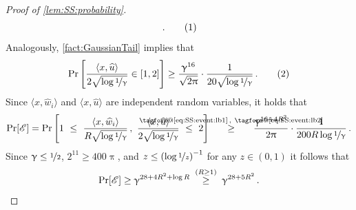 \documentclass[11pt,letterpaper]{article}
\makeatletter
\theoremstyle{plain}
\theoremstyle{definition}
\theoremstyle{remark}
\newcommand{\yesnum}{\addtocounter{equation}{1}\tag{\theequation}}
\renewcommand{\eqref}[1]{\textup{\eqrefform@{\ref{#1}}}}
\let\eqrefform@\tagform@
\newcommand{\Stackrel}[2]{\stackrel{\mathmakebox[\widthof{\ensuremath{#2}}]{#1}}{#2}}
\newcommand{\sinangle}[1]{\ensuremath{\langle#1\rangle}}
\newcommand{\inparen}[1]{\ensuremath{\left(#1\right)}}
\newcommand{\insquare}[1]{\ensuremath{\left[#1\right]}}
\newcommand{\inangle}[1]{\left\langle#1\right\rangle}
\newcommand{\evE}{\ensuremath{\mathscr{E}}}
\newcommand{\nfrac}[2]{\nicefrac{#1}{#2}}
\newcommand{\wh}[1]{\widehat{#1}}
\renewcommand{\gamma}{\upgamma}
\renewcommand{\pi}{\uppi}
\makeatother
\begin{document}
{{{\begin{proof}[Proof of \cref{lem:SS:probability}]
\[                        \,.
                        \yesnum\label{eq:SS:event:lb1}
                    \]
                    Analogously, \cref{fact:GaussianTail} implies that 
                    \[
                        \Pr\insquare{
                            \frac{\sinangle{x, \wh{u}}}{
                                2\sqrt{\log{\nfrac{1}{\gamma}}}
                            } \in [1,2]
                        }
                        \geq \frac{\gamma^{16}}{\sqrt{2\pi}} \cdot \frac{1}{20\sqrt{\log{\nfrac{1}{\gamma}}}}
                        \,.
                        \yesnum\label{eq:SS:event:lb2}
                    \]
                    Since $\sinangle{x, \wh{w}_i}$ and $\sinangle{x, \wh{u}}$ are independent random variables, it holds that 
                    \[
                        \Pr[\evE]
                        = 
                        \Pr\insquare{
                            1 ~\leq~ 
                            \frac{\inangle{x, \wh{w}_i}}{
                                R\sqrt{\log{\nfrac{1}{\gamma}}}
                            }\,,
                            ~
                            \frac{\inangle{x, \wh{u}}}{
                                2\sqrt{\log{\nfrac{1}{\gamma}}}
                            }
                            ~\leq~ 2
                        }
                        ~~\quad\Stackrel{
                            \eqref{eq:SS:event:lb1}\,,~
                            \eqref{eq:SS:event:lb2}
                        }{\geq}\quad~~
                        \frac{\gamma^{16+4R^2}}{2\pi}\cdot \frac{1}{200R\log{\nfrac{1}{\gamma}}}\,.
                    \]
                    Since $\gamma \leq \nfrac{1}{2}$, $2^{11}\geq {400\pi}$, and $z\leq \inparen{{\log{\nfrac{1}{z}}}}^{-1}$ for any $z\in (0,1)$ it follows that 
                    \[
                        \Pr[\evE]
                        \geq 
                        \gamma^{28+4R^2+\log{R}}
                        ~~~\Stackrel{(R\geq 1)}{\geq}~~~
                        \gamma^{28+5R^2}\,.
                    \]
                    

\end{proof}}}}
\end{document}
